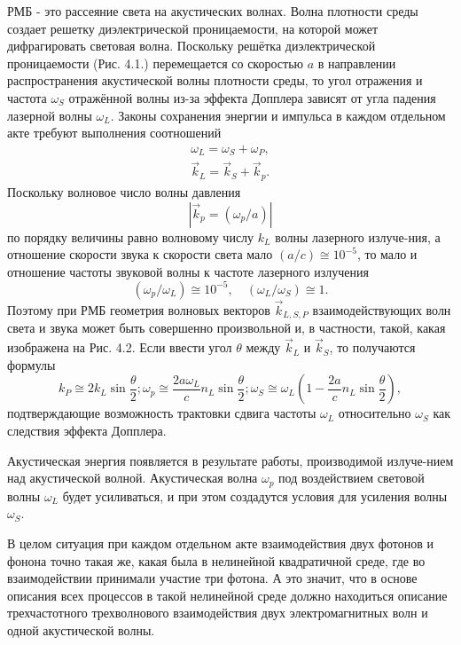 \documentclass[a4paper]{article}
\begin{document}
РМБ  - это рассеяние света на акустических волнах. Волна плотности среды создает решетку диэлектрической проницаемости, на которой может дифрагировать световая волна. Поскольку решётка диэлектрической проницаемости (Рис. 4.1.) перемещается со скоростью $a$  в направлении распространения акустической волны плотности среды, то угол отражения и частота $\omega_{S}$  отражённой волны из-за эффекта Допплера зависят от угла падения лазерной волны $\omega_{L}$. Законы сохранения энергии и импульса в каждом отдельном акте требуют выполнения соотношений 
\begin{equation}
	\begin{split}
		\omega_{L}=\omega_{S}+\omega_{P},\\
		\vec{k}_{L}=\vec{k}_{S}+\vec{k}_{p}.
	\end{split}
	\label{1.4.1}
\end{equation}
Поскольку волновое число волны давления 
\begin{equation}
	\left|\vec{k}_{p}=(\omega_{p}/a)\right|
	\label{1.4.2}
\end{equation}
по порядку величины равно волновому числу $k_{L}$   волны лазерного излуче-ния, а отношение скорости звука к скорости света мало $(a/c)\cong10^{-5}$,  то мало и отношение частоты звуковой волны к частоте лазерного излучения $$(\omega_{p}/\omega_{L})\cong10^{-5},\quad(\omega_{L}/\omega_{S})\cong1.$$
Поэтому при РМБ геометрия волновых векторов $\vec{k}_{L,S,P}$ взаимодействующих волн света и звука может быть совершенно произвольной и, в частности, такой, какая изображена на Рис. 4.2.  Если ввести угол  $\theta$   между $\vec{k}_{L}$  и $\vec{k}_{S}$, то получаются формулы 
\begin{equation}
	k_{P}\cong2k_{L}\sin\frac{\theta}{2};\omega_{p}\cong\frac{2a\omega_{L}}{c}n_{L}\sin\frac{\theta}{2};\omega_{S}\cong\omega_{L}\left(1-\frac{2a}{c}n_{L}\sin\frac{\theta}{2}\right),\label{1.4.3}
\end{equation}
подтверждающие возможность трактовки сдвига частоты $\omega_{L}$ относительно $\omega_{S}$ как следствия эффекта Допплера. 


Акустическая энергия появляется в результате работы, производимой излуче-нием над акустической волной. Акустическая волна $\omega_{p}$ под воздействием  световой волны $\omega_{L}$ будет усиливаться, и при этом создадутся условия для усиления волны $\omega_{S}$. 

В целом ситуация при каждом отдельном акте взаимодействия двух фотонов и фонона точно такая же, какая была в нелинейной квадратичной среде, где во взаимодействии принимали участие три фотона. А это значит, что в основе описания всех процессов в такой нелинейной среде должно находиться описание трехчастотного трехволнового взаимодействия двух электромагнитных волн и одной акустической волны. 
\end{document}
